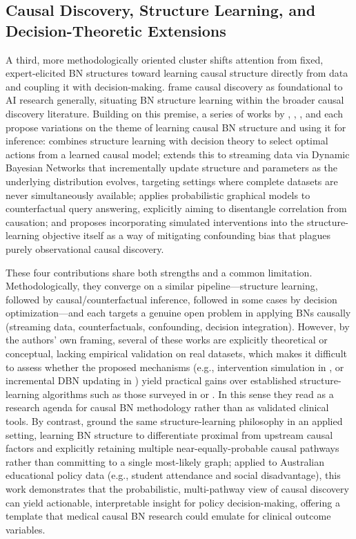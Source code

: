 \subsection{Causal Discovery, Structure Learning, and Decision-Theoretic Extensions}
A third, more methodologically oriented cluster shifts attention from fixed, expert-elicited BN structures toward learning causal structure directly from data and coupling it with decision-making. \cite{gao2026bayesian} frame causal discovery as foundational to AI research generally, situating BN structure learning within the broader causal discovery literature. Building on this premise, a series of works by \cite{zhang2026causalg}, \cite{zhang2026dynamic}, \cite{zhang2026causalh}, and \cite{zhang2026causaln} each propose variations on the theme of learning causal BN structure and using it for inference: \cite{zhang2026causalg} combines structure learning with decision theory to select optimal actions from a learned causal model; \cite{zhang2026dynamic} extends this to streaming data via Dynamic Bayesian Networks that incrementally update structure and parameters as the underlying distribution evolves, targeting settings where complete datasets are never simultaneously available; \cite{zhang2026causalh} applies probabilistic graphical models to counterfactual query answering, explicitly aiming to disentangle correlation from causation; and \cite{zhang2026causaln} proposes incorporating simulated interventions into the structure-learning objective itself as a way of mitigating confounding bias that plagues purely observational causal discovery. 

These four contributions share both strengths and a common limitation. Methodologically, they converge on a similar pipeline---structure learning, followed by causal/counterfactual inference, followed in some cases by decision optimization---and each targets a genuine open problem in applying BNs causally (streaming data, counterfactuals, confounding, decision integration). However, by the authors' own framing, several of these works are explicitly theoretical or conceptual, lacking empirical validation on real datasets, which makes it difficult to assess whether the proposed mechanisms (e.g., intervention simulation in \cite{zhang2026causaln}, or incremental DBN updating in \cite{zhang2026dynamic}) yield practical gains over established structure-learning algorithms such as those surveyed in \cite{bielza2014bayesian} or \cite{gao2026bayesian}. In this sense they read as a research agenda for causal BN methodology rather than as validated clinical tools. By contrast, \cite{moreira2025bayesian} ground the same structure-learning philosophy in an applied setting, learning BN structure to differentiate proximal from upstream causal factors and explicitly retaining multiple near-equally-probable causal pathways rather than committing to a single most-likely graph; applied to Australian educational policy data (e.g., student attendance and social disadvantage), this work demonstrates that the probabilistic, multi-pathway view of causal discovery can yield actionable, interpretable insight for policy decision-making, offering a template that medical causal BN research could emulate for clinical outcome variables.

